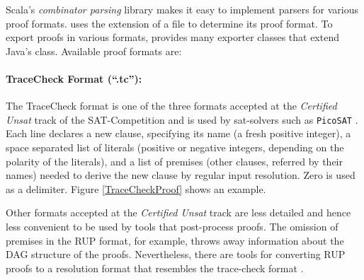 \documentclass{llncs}
\begin{document}
Scala's \emph{combinator parsing} library makes it easy to implement parsers for various proof formats. {\skeptik} uses the extension of a file to  determine its proof format. To export proofs in various formats, {\skeptik} provides many exporter classes that extend Java's  class. Available proof formats are:


\paragraph{TraceCheck Format (``.tc''): }

The TraceCheck \cite{tracecheck} format is one of the three formats accepted at the \emph{Certified Unsat} track of the SAT-Competition and is used by sat-solvers such as \texttt{PicoSAT} \cite{Biere_picosatessentials}. Each line declares a new clause, specifying its name (a fresh positive integer), a space separated list of literals (positive or negative integers, depending on the polarity of the literals), and a list of premises (other clauses, referred by their names) needed to derive the new clause by regular input resolution. Zero is used as a delimiter. Figure \ref{TraceCheckProof} shows an example.

Other formats accepted at the \emph{Certified Unsat} track are less detailed and hence less convenient to be used by tools that post-process proofs. The omission of premises in the RUP format, for example, throws away information about the DAG structure of the proofs. Nevertheless, there are tools for converting RUP proofs to a resolution format that resembles the trace-check format \cite{van2008verifying}.

\end{document}
